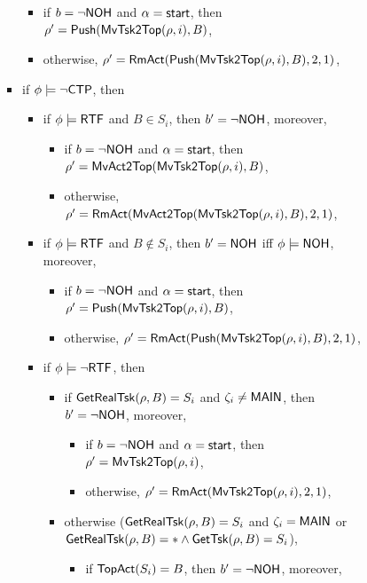 \begin{itemize}
\begin{itemize}
\begin{itemize}
\begin{itemize}
\begin{itemize}
\begin{itemize}
							\item if $b = \neg {\sf NOH}$ and $\alpha = {\mathsf{start} }$, then $\rho'=\mathsf{Push}(\mathsf{MvTsk2Top}(\rho, i), B)$,
							\item otherwise, $\rho' = \mathsf{RmAct}(\mathsf{Push}(\mathsf{MvTsk2Top}(\rho, i), B), 2, 1)$, 
						\end{itemize}
						\item if $\phi \models\neg{\sf CTP}$, then
						\begin{itemize}
							\item if $\phi \models {\sf RTF}$ and $B\in S_i$, then $b' = \neg {\sf NOH}$, moreover,
							\begin{itemize}
								\item if $b = \neg {\sf NOH}$ and $\alpha = {\mathsf{start} }$, then $\rho'=\mathsf{MvAct2Top}(\mathsf{MvTsk2Top}(\rho, i), B)$,
								\item otherwise, $\rho' = \mathsf{RmAct}(\mathsf{MvAct2Top}(\mathsf{MvTsk2Top}(\rho, i), B), 2, 1)$, 
							\end{itemize}
							\item if $\phi \models {\sf RTF}$ and $B\notin S_i$, then $b' = {\sf NOH}$ iff $\phi \models {\sf NOH}$, moreover, 
							\begin{itemize}
								\item if $b = \neg {\sf NOH}$ and $\alpha = {\mathsf{start} }$, then $\rho'=\mathsf{Push}(\mathsf{MvTsk2Top}(\rho, i), B)$,
								\item otherwise, $\rho' = \mathsf{RmAct}(\mathsf{Push}(\mathsf{MvTsk2Top}(\rho, i), B), 2, 1)$, 
							\end{itemize}
							\item if $\phi \models \neg {\sf RTF}$, then
							\begin{itemize}
								\item if $\mathsf{GetRealTsk}(\rho,B) = S_i$ and $\zeta_i \neq {\sf MAIN}$, then $b' = \neg {\sf NOH}$, moreover,
								\begin{itemize}
									\item if $b = \neg {\sf NOH}$ and $\alpha = {\mathsf{start} }$, then $\rho'=\mathsf{MvTsk2Top}(\rho, i)$,
									\item otherwise, $\rho' = \mathsf{RmAct}(\mathsf{MvTsk2Top}(\rho, i), 2, 1)$, 
								\end{itemize}
								\item otherwise ($\mathsf{GetRealTsk}(\rho,B) = S_i$ and $\zeta_i = {\sf MAIN}$ or $\mathsf{GetRealTsk}(\rho,B) = * \wedge\mathsf{GetTsk}(\rho,B) = S_i$), 
								\begin{itemize}
									\item if $\mathsf{TopAct}(S_i) = B$, then $b' = \neg {\sf NOH}$, moreover,

\end{itemize}
\end{itemize}
\end{itemize}
\end{itemize}
\end{itemize}
\end{itemize}
\end{itemize}
\end{itemize}
